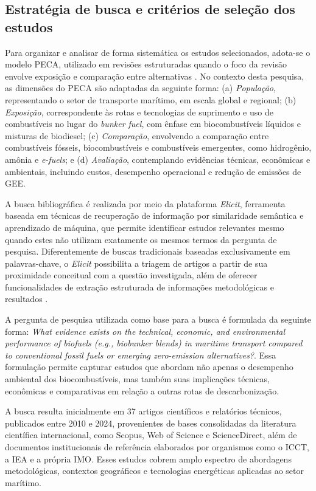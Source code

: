 \subsection{Estratégia de busca e critérios de seleção dos estudos}
Para organizar e analisar de forma sistemática os estudos selecionados, adota-se o modelo \gls{PECA}, utilizado em revisões estruturadas quando o foco da revisão envolve exposição e comparação entre alternativas \citep{morgan_identifying_2018}. No contexto desta pesquisa, as dimensões do \gls{PECA} são adaptadas da seguinte forma: (a) \emph{População}, representando o setor de transporte marítimo, em escala global e regional; (b) \emph{Exposição}, correspondente às rotas e tecnologias de suprimento e uso de combustíveis no lugar do \emph{bunker fuel}, com ênfase em biocombustíveis líquidos e misturas de biodiesel; (c) \emph{Comparação}, envolvendo a comparação entre combustíveis fósseis, biocombustíveis e combustíveis emergentes, como hidrogênio, amônia e \emph{e-fuels}; e (d) \emph{Avaliação}, contemplando evidências técnicas, econômicas e ambientais, incluindo custos, desempenho operacional e redução de emissões de \gls{GEE}.

A busca bibliográfica é realizada por meio da plataforma \emph{Elicit}, ferramenta baseada em técnicas de recuperação de informação por similaridade semântica e aprendizado de máquina, que permite identificar estudos relevantes mesmo quando estes não utilizam exatamente os mesmos termos da pergunta de pesquisa. Diferentemente de buscas tradicionais baseadas exclusivamente em palavras-chave, o \emph{Elicit} possibilita a triagem de artigos a partir de sua proximidade conceitual com a questão investigada, além de oferecer funcionalidades de extração estruturada de informações metodológicas e resultados \citep{lau_comparison_2025,bernard_using_2025}.

A pergunta de pesquisa utilizada como base para a busca é formulada da seguinte forma: \emph{What evidence exists on the technical, economic, and environmental performance of biofuels (e.g., biobunker blends) in maritime transport compared to conventional fossil fuels or emerging zero-emission alternatives?}. Essa formulação permite capturar estudos que abordam não apenas o desempenho ambiental dos biocombustíveis, mas também suas implicações técnicas, econômicas e comparativas em relação a outras rotas de descarbonização.

A busca resulta inicialmente em 37 artigos científicos e relatórios técnicos, publicados entre 2010 e 2024, provenientes de bases consolidadas da literatura científica internacional, como Scopus, Web of Science e ScienceDirect, além de documentos institucionais de referência elaborados por organismos como o \gls{ICCT}, a \gls{IEA} e a própria \gls{IMO}. Esses estudos cobrem amplo espectro de abordagens metodológicas, contextos geográficos e tecnologias energéticas aplicadas ao setor marítimo.

